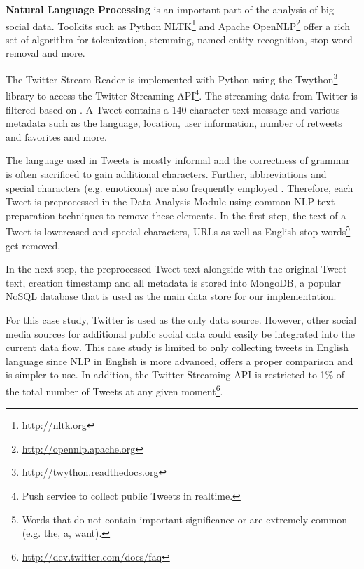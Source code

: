 \textbf{Natural Language Processing} is an important part of the analysis of big social data. Toolkits such as Python NLTK\footnote{\url{http://nltk.org} \accessednote} and Apache OpenNLP\footnote{\url{http://opennlp.apache.org} \accessednote} offer a rich set of algorithm for tokenization, stemming, named entity recognition, stop word removal and more. 

The Twitter Stream Reader is implemented with Python using the Twython\footnote{\url{http://twython.readthedocs.org} \accessednote} library to access the Twitter Streaming API\footnote{Push service to collect public Tweets in realtime.}. The streaming data from Twitter is filtered based on . A Tweet contains a 140 character text message and various metadata such as the language, location, user information, number of retweets and favorites and more. 

The language used in Tweets is mostly informal and the correctness of grammar is often sacrificed to gain additional characters. Further, abbreviations and special characters (e.g. emoticons) are also frequently employed \cite[67]{TwitterDataAnalytics2013}. Therefore, each Tweet is preprocessed in the Data Analysis Module using common NLP text preparation techniques to remove these elements. In the first step, the text of a Tweet is lowercased and special characters, URLs as well as English stop words\footnote{Words that do not contain important significance or are extremely common (e.g. the, a, want).} get removed.

In the next step, the preprocessed Tweet text alongside with the original Tweet text, creation timestamp and all metadata is stored into MongoDB, a popular NoSQL database that is used as the main data store for our implementation.

For this case study, Twitter is used as the only data source. However, other social media sources for additional public social data could easily be integrated into the current data flow. This case study is limited to only collecting tweets in English language since NLP in English is more advanced, offers a proper comparison and is simpler to use. In addition, the Twitter Streaming API is restricted to 1\% of the total number of Tweets at any given moment\footnote{\url{http://dev.twitter.com/docs/faq} \accessednote}.